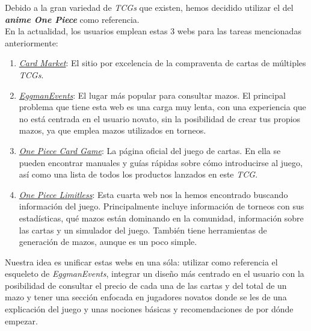 \documentclass[10pt]{article}
\begin{document}
	Debido a la gran variedad de \textit{TCGs} que existen, hemos decidido utilizar el del  \textbf{\textit{anime One Piece}} como referencia. \\
    
	En la actualidad, los usuarios emplean estas 3 webs para las tareas mencionadas anteriormente:
	\begin{enumerate}
		\item \href{https://www.cardmarket.com/es/OnePiece}{\textit{Card Market}}: El sitio por excelencia de la compraventa de cartas de múltiples \textit{TCGs}.
		\item \href{https://deckbuilder.egmanevents.com/optcg/cards}{\textit{EggmanEvents}}: El lugar más popular para consultar mazos. El principal problema que tiene esta web es una carga muy lenta, con una experiencia que no está centrada en el usuario novato, sin la posibilidad de crear tus propios mazos, ya que emplea mazos utilizados en torneos.
		\item \href{https://en.onepiece-cardgame.com/beginners/}{\textit{One Piece Card Game}}: La página oficial del juego de cartas. En ella se pueden encontrar manuales y guías rápidas sobre cómo introducirse al juego, así como una lista de todos los productos lanzados en este \textit{TCG}.
		\item \href{https://onepiece.limitlesstcg.com}{\textit{One Piece Limitless}}: Esta cuarta web nos la hemos encontrado buscando información del juego. Principalmente incluye información de torneos con sus estadísticas, qué mazos están dominando en la comunidad, información sobre las cartas y un simulador del juego. También tiene herramientas de generación de mazos, aunque es un poco simple.
	\end{enumerate}
	Nuestra idea es unificar estas webs en una sóla: utilizar como referencia el esqueleto de \textit{EggmanEvents}, integrar un diseño más centrado en el usuario con la posibilidad de consultar el precio de cada una de las cartas y del total de un mazo y tener una sección enfocada en jugadores novatos donde se les de una explicación del juego y unas nociones básicas y recomendaciones de por dónde empezar.
	
	
\end{document}
